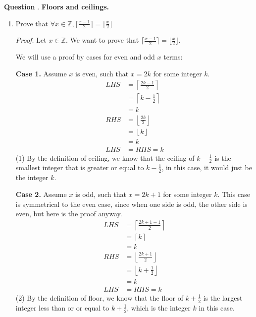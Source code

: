 \documentclass{article}
\newcounter{qcount}
\newcommand\q{\stepcounter{qcount} \textbf{Question \theqcount}. }
\begin{document}
\newpage 
\q \textbf{Floors and ceilings.}
\begin{enumerate}[label=(\alph*)]
    \item Prove that $\forall x \in \mathbb{Z}, \lceil{\frac{x-1}{2}}\rceil 
        = \lfloor{\frac{x}{2}}\rfloor$
    
        \textit{Proof.} Let $x \in \mathbb{Z}$. We want to prove that 
        $\lceil{\frac{x-1}{2}}\rceil 
        = \lfloor{\frac{x}{2}}\rfloor$.
        
        We will use a proof by cases for even and odd $x$ terms: 

        \textbf{Case 1.} Assume $x$ is even, such that $x = 2k$ for some integer $k$.
        \begin{align*}
            LHS &= \left\lceil \frac{2k -1 }{2} \right\rceil\\
            &= \left\lceil k - \frac{1}{2} \right\rceil \\
            &= k
            \tag*{(1)}\\
            RHS &= \left\lfloor \frac{2k}{2} \right\rfloor \\
                &= \left\lfloor k \right\rfloor  \\
                &= k \\
            LHS &= RHS = k 
        \end{align*}
        (1) By the definition of ceiling, we know that the ceiling of $k - 
        \frac{1}{2}$ 
        is the smallest integer that is greater or equal to $k - \frac{1}{2}$, 
        in this case, it would just be the integer $k$. 

        \textbf{Case 2.} Assume $x$ is odd, such that $x = 2k + 1$ for some 
        integer $k$. This case is symmetrical to the even case, since when 
        one side is odd, the other side is even, but here is the proof anyway.
        \begin{align*}
            LHS &= \left\lceil \frac{2k + 1 -1}{2}\right\rceil  \\
                &= \left\lceil k \right\rceil \\
                &= k \\
            RHS &= \left\lfloor \frac{2k + 1}{2} \right\rfloor \\
                &= \left\lfloor k + \frac{1}{2} \right\rfloor 
                \tag*{(2)}\\
                &= k \\
            LHS &= RHS = k
        \end{align*}
        (2) By the definition of floor, we know that the floor of $k + 
        \frac{1}{2}$ is the largest integer less than or or equal to $k + 
        \frac{1}{2}$, which is the integer $k$ in this case.  


\end{enumerate}
\end{document}
